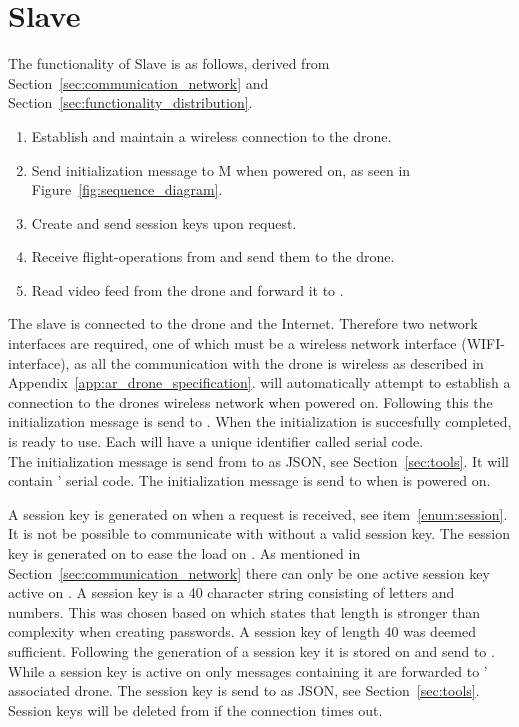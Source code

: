 \section{Slave}
\label{sec:design_slave}
The functionality of Slave is as follows, derived from Section~\ref{sec:communication_network} and Section~\ref{sec:functionality_distribution}.

\begin{enumerate}
	\item Establish and maintain a wireless connection to the drone.\label{enum:wireless}
	\item Send initialization message to M when powered on, as seen in Figure~\ref{fig:sequence_diagram}.\label{enum:initialization}
	\item Create and send session keys upon request.\label{enum:session}
	\item Receive flight-operations from  and send them to the drone.\label{enum:actions}
	\item Read video feed from the drone and forward it to .\label{enum:stream}
\end{enumerate}

The slave is connected to the drone and the Internet. %
Therefore two network interfaces are required, one of which must be a wireless network interface (WIFI-interface), as all the communication with the drone is wireless as described in Appendix~\ref{app:ar_drone_specification}.
 will automatically attempt to establish a connection to the drones wireless network when powered on.
Following this the initialization message is send to .
When the initialization is succesfully completed,  is ready to use.
Each  will have a unique identifier called serial code. \\

The initialization message is send from  to  as JSON, see Section~\ref{sec:tools}.
It will contain ' serial code.
The initialization message is send to  when  is powered on.

A session key is generated on  when a request is received, see item~\ref{enum:session}.
It is not be possible to communicate with  without a valid session key.
The session key is generated on  to ease the load on .
As mentioned in Section~\ref{sec:communication_network} there can only be one active session key active on .
A session key is a 40 character string consisting of letters and numbers.
This was chosen based on \citep{password_length} which states that length is stronger than complexity when creating passwords.
A session key of length 40 was deemed sufficient.
Following the generation of a session key it is stored on  and send to .
While a session key is active on  only messages containing it are forwarded to ' associated drone.
The session key is send to  as JSON, see Section~\ref{sec:tools}.
Session keys will be deleted from  if the connection times out.


